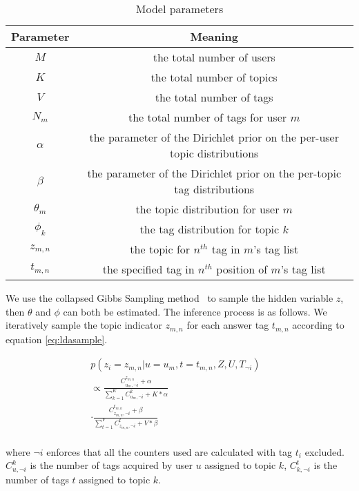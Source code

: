 \begin{table}[htbp]
\caption{Model parameters}
\label{tab:parameters}
\centering
\begin{tabular}{|c|c|}
\hline
Parameter & Meaning \\
\hline
$M$ & the total number of users\\
\hline
$K$ & the total number of topics\\
\hline
$V$ & the total number of tags\\
\hline
$N_m$ & the total number of tags for user $m$\\
\hline
$\alpha$ & the parameter of the Dirichlet prior on the per-user topic distributions \\
\hline
$\beta$ & the parameter of the Dirichlet prior on the per-topic tag distributions  \\
\hline
$\theta_m$ & the topic distribution for user $m$ \\
\hline
$\phi_k$ & the tag distribution for topic $k$ \\
\hline
$z_{m,n}$ & the topic for $n^{th}$ tag in $m$'s tag list \\
\hline
$t_{m,n}$ & the specified tag in $n^{th}$ position of $m$'s tag list\\
\hline

\end{tabular}
\end{table}

We use the collapsed Gibbs Sampling method~\cite{griffiths2004finding} to sample the hidden variable $z$, then $\theta$ and $\phi$ can both be estimated.
The inference process is as follows.
We iteratively sample the topic indicator $z_{m,n}$ for each answer tag $t_{m,n}$ according to equation \ref{eq:ldasample}. 


\begin{equation}
\begin{split}
p(z_i= z_{m,n} |u=u_m, t=t_{m,n}, Z, U, T_{\neg i}) &\\
\propto \frac{ C_{u_m,\neg i}^{z_{m,n}} + \alpha }{ \sum_{k=1}^K C_{u_m,\neg i}^k + K* \alpha} &\\
\cdot   \frac{ C_{z_{m,n},\neg i}^{t_{m,n}} + \beta }{ \sum_{t=1}^V C_{z_{m,n},\neg i}^t + V* \beta} &\\ 
\end{split}
\label{eq:ldasample}
\end{equation}

\noindent
where $\neg i$ enforces that all the counters used are calculated with tag $t_i$ excluded. $C_{u,\neg i}^k$ is the number of tags acquired by user $u$ assigned to topic $k$, $C_{k,\neg i}^{t}$ is the number of tags $t$ assigned to topic $k$.

